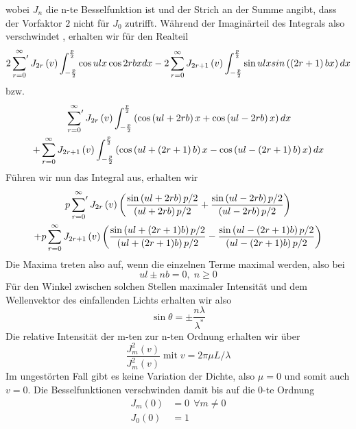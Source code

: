 wobei $J_{n}$ die n-te Besselfunktion ist und der Strich an der Summe angibt, dass der Vorfaktor $2$ nicht für $J_{0}$ zutrifft. Während der Imaginärteil des Integrals also verschwindet \cite{Raman}, erhalten wir für den Realteil
\begin{equation}
 2 \sideset{}{'} \sum_{r=0}^{\infty} J_{2r} \left( v \right) \int_{-\frac{p}{2}}^{\frac{p}{2}} \cos ulx \cos 2rbx dx - 2 \sum_{r=0}^{\infty} J_{2r+1} \left( v \right) \int_{-\frac{p}{2}}^{\frac{p}{2}} \sin ulx sin \left( \left( 2r+1 \right) bx \right) dx
\end{equation}
bzw.
\begin{multline}
 \sideset{}{'} \sum_{r=0}^{\infty} J_{2r} \left( v \right) \int_{-\frac{p}{2}}^{\frac{p}{2}} \left( \cos \left( ul + 2rb \right)x + \cos \left( ul - 2rb \right)x \right) dx \\
 + \sum_{r=0}^{\infty} J_{2r+1} \left( v \right) \int_{-\frac{p}{2}}^{\frac{p}{2}} \left( \cos \left( ul + \left(  2r+1 \right) b \right)x - \cos \left( ul - \left(  2r+1 \right) b \right)x  \right) dx
\end{multline}
Führen wir nun das Integral aus, erhalten wir
\begin{multline}
 p \sideset{}{'} \sum_{r=0}^{\infty} J_{2r} \left( v \right) \left( \frac{\sin \left(ul+2rb\right)p/2}{\left(ul+2rb\right)p/2} + \frac{\sin \left(ul-2rb\right)p/2}{\left(ul-2rb\right)p/2} \right) \\
 + p \sum_{r=0}^{\infty} J_{2r+1} \left( v \right) \left( \frac{\sin \left(ul+(2r+1)b\right)p/2}{\left(ul+(2r+1)b\right)p/2} - \frac{\sin \left(ul-(2r+1)b\right)p/2}{\left(ul-(2r+1)b\right)p/2} \right)
\end{multline}
Die Maxima treten also auf, wenn die einzelnen Terme maximal werden, also bei
\begin{equation}
 ul \pm nb = 0,\;  n \geq 0
\end{equation}
Für den Winkel zwischen solchen Stellen maximaler Intensität und dem Wellenvektor des einfallenden Lichts erhalten wir also
\begin{equation}
  \sin \theta = \pm \frac{n \lambda}{\lambda^*} 
\end{equation}
Die relative Intensität der m-ten zur n-ten Ordnung erhalten wir über
\begin{equation}
  \frac{J_m^2(v)}{J_m^2(v)}  \; \text{mit} \; v = 2 \pi \mu L / \lambda
\end{equation}
Im ungestörten Fall gibt es keine Variation der Dichte, also $\mu = 0$ und somit auch $v=0$. Die Besselfunktionen verschwinden damit bis auf die 0-te Ordnung
\begin{align}
 J_m(0) & = 0 \ \ \forall m \neq 0 \\
 J_0(0) & = 1
\end{align}
 

